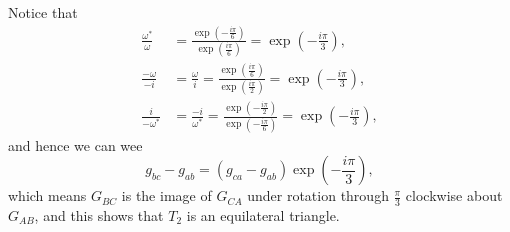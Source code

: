 \begin{enumerate}
          Notice that
          \begin{align*}
              \frac{\omega^*}{\omega} & = \frac{\exp\left(-\frac{i\pi}{6}\right)}{\exp\left(\frac{i\pi}{6}\right)} = \exp\left(-\frac{i\pi}{3}\right),                        \\
              \frac{-\omega}{-i}      & = \frac{\omega}{i} = \frac{\exp\left(\frac{i\pi}{6}\right)}{\exp\left(\frac{i\pi}{2}\right)} = \exp\left(-\frac{i\pi}{3}\right),      \\
              \frac{i}{-\omega^*}     & = \frac{-i}{\omega^*} = \frac{\exp\left(-\frac{i\pi}{2}\right)}{\exp\left(-\frac{i\pi}{6}\right)} = \exp\left(-\frac{i\pi}{3}\right),
          \end{align*}
          and hence we can wee
          \[
              g_{bc} - g_{ab} = \left(g_{ca} - g_{ab}\right) \exp\left(- \frac{i\pi}{3}\right),
          \]
          which means \(G_{BC}\) is the image of \(G_{CA}\) under rotation through \(\frac{\pi}{3}\) clockwise about \(G_{AB}\), and this shows that \(T_2\) is an equilateral triangle.
\end{enumerate}